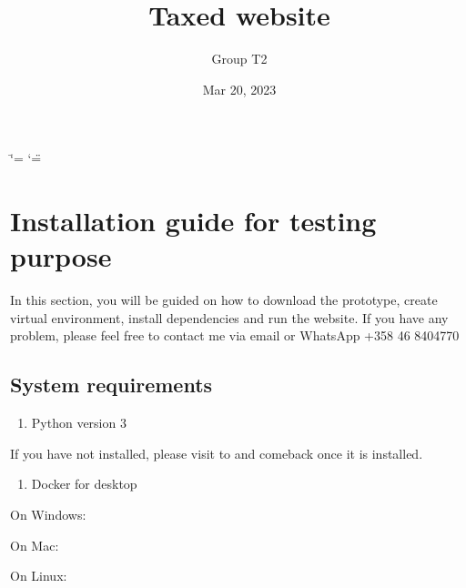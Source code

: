 \documentclass[letterpaper,10pt,english]{sphinxmanual}
\title{Taxed website}
\date{Mar 20, 2023}
\author{Group T2}
\begin{document}
\ifdefined\shorthandoff
  \ifnum\catcode`\=\string=\active\shorthandoff{=}\fi
  \ifnum\catcode`\"=\active{}\fi
\fi

\pagestyle{empty}
\sphinxmaketitle
\pagestyle{plain}
\sphinxtableofcontents
\pagestyle{normal}
\label{\detokenize{index::doc}}


\sphinxstepscope


\chapter{Installation guide for testing purpose}
\label{\detokenize{pages/installation-testing:installation-guide-for-testing-purpose}}\label{\detokenize{pages/installation-testing::doc}}
\sphinxAtStartPar
In this section, you will be guided on how to download the prototype, create virtual environment, install dependencies and run the website.
If you have any problem, please feel free to contact me via email  or WhatsApp +358 46 8404770


\section{System requirements}
\label{\detokenize{pages/installation-testing:system-requirements}}\begin{enumerate}
%
\item {} 
\sphinxAtStartPar
Python version 3

\end{enumerate}

\sphinxAtStartPar
If you have not installed, please visit to  and comeback once it is installed.
\begin{enumerate}
%
\setcounter{enumi}{1}
\item {} 
\sphinxAtStartPar
Docker for desktop

\end{enumerate}

\sphinxAtStartPar
On Windows: 

\sphinxAtStartPar
On Mac: 

\sphinxAtStartPar
On Linux: 
\end{document}
